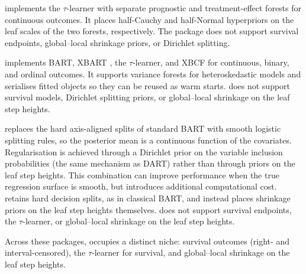  \citep{hahn2020bayesian} implements the \(\tau\)-learner with separate prognostic and treatment-effect forests for continuous outcomes. It places half-Cauchy and half-Normal hyperpriors on the leaf scales of the two forests, respectively. The package does not support survival endpoints, global--local shrinkage priors, or Dirichlet splitting.

 \citep{stochtree} implements BART, XBART \citep{he2019xbart}, the \(\tau\)-learner, and XBCF for continuous, binary, and ordinal outcomes. It supports variance forests for heteroskedastic models and serialises fitted objects so they can be reused as warm starts.  does not support survival models, Dirichlet splitting priors, or global--local shrinkage on the leaf step heights.

 \citep{linero2018softbart} replaces the hard axis-aligned splits of standard BART with smooth logistic splitting rules, so the posterior mean is a continuous function of the covariates. Regularisation is achieved through a Dirichlet prior on the variable inclusion probabilities (the same mechanism as DART) rather than through priors on the leaf step heights. This combination can improve performance when the true regression surface is smooth, but introduces additional computational cost.  retains hard decision splits, as in classical BART, and instead places shrinkage priors on the leaf step heights themselves.  does not support survival endpoints, the \(\tau\)-learner, or global--local shrinkage on the leaf step heights.

Across these packages,  occupies a distinct niche: survival outcomes (right- and interval-censored), the \(\tau\)-learner for survival, and global--local shrinkage on the leaf step heights.

